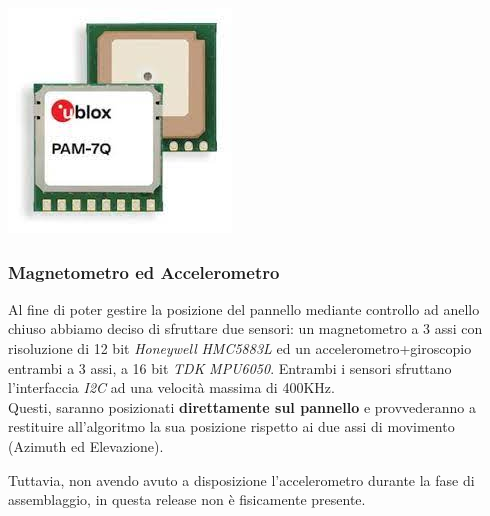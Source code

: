 \begin{center}
\includegraphics[scale=0.8]{figures/image30.jpg}
\captionsetup{type=figure}
\end{center}

\hypertarget{magnetometro-ed-accelerometro}{%
\subsubsection{\texorpdfstring{\hfill\break
Magnetometro ed Accelerometro\\
}{ Magnetometro ed Accelerometro }}\label{magnetometro-ed-accelerometro}}

Al fine di poter gestire la posizione del pannello mediante controllo ad
anello chiuso abbiamo deciso di sfruttare due sensori: un magnetometro a
3 assi con risoluzione di 12 bit \emph{Honeywell} \emph{HMC5883L} ed un
accelerometro+giroscopio entrambi a 3 assi, a 16 bit \emph{TDK}
\emph{MPU6050}. Entrambi i sensori sfruttano l'interfaccia \emph{I2C} 
ad una velocità massima di 400KHz.\\
Questi, saranno posizionati \textbf{direttamente sul pannello} e
provvederanno a restituire all'algoritmo la sua posizione
rispetto ai due assi di movimento (Azimuth ed Elevazione).

Tuttavia, non avendo avuto a disposizione l'accelerometro durante la
fase di assemblaggio, in questa release non è fisicamente presente.

